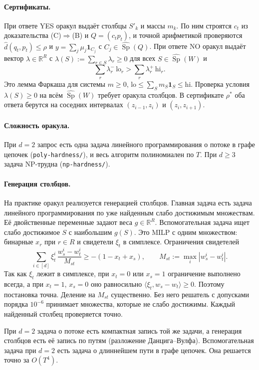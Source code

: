\documentclass[a4paper,11pt]{article}
\theoremstyle{plain}
\theoremstyle{definition}
\theoremstyle{remark}
\newcommand{\R}{\mathbb{R}}
\newcommand{\abs}[1]{\left\lvert #1 \right\rvert}
\newcommand{\ip}[2]{\langle #1, #2\rangle} %
\DeclareMathOperator{\Sp}{Sp}
\newcommand{\dd}{\widehat d}
\begin{document}
\paragraph{Сертификаты.} При ответе YES оракул выдаёт столбцы $S'_k$ и массы $m_k$. По ним строятся $c_t$ из доказательства (C)$\Rightarrow$(B) и $Q=(c_tp_t)$, и точной арифметикой проверяются $\dd(q_t,p_t)\le\rho$ и $y=\sum_j\mu_j\mathbf 1_{C_j}$ с $C_j\in\widehat{\Sp}(Q)$. При ответе NO оракул выдаёт вектор $\lambda\in\R^R$ с $\lambda(S):=\sum_{r\in S}\lambda_r\ge0$ для всех $S\in\widehat{\Sp}(W)$ и
\[
    \sum_r\lambda_r^-\,\mathrm{lo}_r>\sum_r\lambda_r^+\,\mathrm{hi}_r.
\]
Это лемма Фаркаша для системы $m\ge0$, $\mathrm{lo}\le\sum_Sm_S\mathbf 1_S\le\mathrm{hi}$. Проверка условия $\lambda(S)\ge0$ на всём $\widehat{\Sp}(W)$ требует оракула столбцов. В сертификате $\rho^*$ оба ответа берутся на соседних интервалах $(z_{i-1},z_i)$ и $(z_i,z_{i+1})$.

\paragraph{Сложность оракула.} При $d=2$ запрос есть одна задача линейного программирования о потоке в графе цепочек (\texttt{poly-hardness/}), и весь алгоритм полиномиален по $T$. При $d\ge3$ задача NP-трудна (\texttt{np-hardness/}).

\paragraph{Генерация столбцов.} На практике оракул реализуется генерацией столбцов. Главная задача есть задача линейного программирования по уже найденным слабо достижимым множествам. Её двойственные переменные задают веса $g\in\R^R$. Вспомогательная задача ищет слабо достижимое $S$ с наибольшим $g(S)$. Это MILP с одним множеством: бинарные $x_r$ при $r\in R$ и свидетели $\xi_t$ в симплексе. Ограничения свидетелей
\[
    \sum_{i\in[d]}\xi_t^i\,\frac{w_s^i-w_t^i}{M_{st}}\ge-(1-x_t+x_s),\qquad M_{st}:=\max_i\abs{w_s^i-w_t^i}.
\]
Так как $\xi_t$ лежит в симплексе, при $x_t=0$ или $x_s=1$ ограничение выполнено всегда, а при $x_t=1$, $x_s=0$ оно равносильно $\ip{\xi_t}{w_s-w_t}\ge0$. Поэтому постановка точна. Деление на $M_{st}$ существенно. Без него решатель с допусками порядка $10^{-6}$ принимает множества, которые не слабо достижимы. Каждый найденный столбец проверяется точно.

При $d=2$ задача о потоке есть компактная запись той же задачи, а генерация столбцов есть её запись по путям (разложение Данцига--Вулфа). Вспомогательная задача при $d=2$ есть задача о длиннейшем пути в графе цепочек. Она решается точно за $O(T^4)$.
\end{document}

